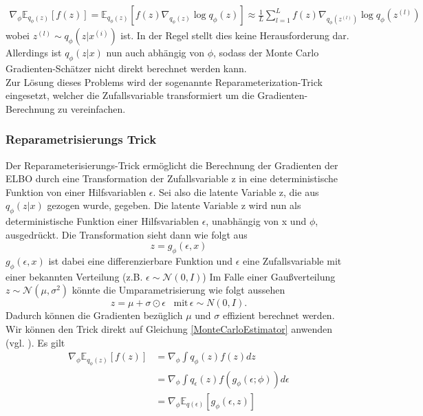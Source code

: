 \documentclass[%
thesis=student,%
coverpage=false,%
titlepage=false,%
headmarks=true, %
german,%
font=libertine, %
math=newpxtx, %
BCOR=5mm,%
coverBCOR=11mm%
]{tumbook}
\theoremstyle{break}
\begin{document}
\begin{align}
 \nabla_\phi \mathbb{E}_{q_\phi(z)}[f(z)]= \mathbb{E}_{q_\phi(z)}[f(z)\nabla_{q_\phi(z)}\log q_\phi(z)] \approx \frac{1}{L} \sum_{l=1}^{L}f(z)\nabla_{q_\phi(z^{(l)})}\log q_\phi(z^{(l)}) \label{MonteCarloEstimator}
\end{align}
wobei $z^{(l)} \sim q_\phi(z|x^{(i)})$ ist. 
In der Regel stellt dies keine Herausforderung dar. Allerdings ist $q_\phi(z|x)$ nun auch abhängig von  $\phi$, sodass der Monte Carlo Gradienten-Schätzer nicht direkt berechnet werden kann. \\
Zur Lösung dieses Problems wird der sogenannte Reparameterization-Trick eingesetzt, welcher die Zufallsvariable transformiert um die Gradienten-Berechnung zu vereinfachen.  
\subsubsection{Reparametrisierungs Trick}
Der Reparameterisierungs-Trick ermöglicht die Berechnung der Gradienten der ELBO durch eine Transformation der Zufallsvariable z in eine deterministische Funktion von einer Hilfsvariablen $\epsilon$.
Sei also die latente Variable z, die aus $q_\phi(z|x)$ gezogen wurde, gegeben. Die latente Variable z wird nun als deterministische Funktion einer Hilfsvariablen $\epsilon$, unabhängig von x und $\phi$, ausgedrückt. 
Die Transformation sieht dann wie folgt aus
$$ z = g_\phi(\epsilon, x)$$
$g_\phi(\epsilon,x) $ ist dabei eine differenzierbare Funktion und $\epsilon$ eine Zufallsvariable mit einer bekannten Verteilung (z.B. $\epsilon \sim \mathcal{N}(0,I)$)
Im Falle einer Gaußverteilung $z \sim \mathcal{N}(\mu, \sigma^2)$ könnte die Umparametrisierung wie folgt aussehen 
$$z=\mu + \sigma \odot \epsilon \hspace{10pt}\text{mit} \hspace{2pt} \epsilon\sim N(0,I).$$ 
Dadurch können die Gradienten bezüglich $\mu$ und $\sigma$ effizient berechnet werden.
\\
Wir können den Trick direkt auf Gleichung \ref{MonteCarloEstimator} anwenden (vgl. \cite{MonteCarloEstimation}). Es gilt
\begin{align}
	 \nabla_\phi \mathbb{E}_{q_\phi(z)}[f(z)] &= \nabla_\phi \int q_\phi(z) f(z) dz \\
	 &= \nabla_\phi \int q_\epsilon(z) f(g_\phi(\epsilon;\phi)) d\epsilon \\
	 &= \nabla_\phi \mathbb{E}_{q(\epsilon)}[g_\phi(\epsilon,z)]
\end{align}
\end{document}
